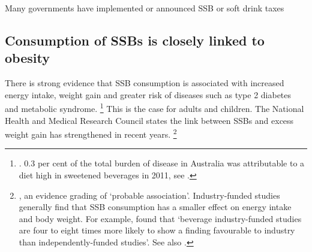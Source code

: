 \documentclass[embargoed]{grattan}
\begin{document}
\begin{table}
\caption{Many governments have implemented or announced SSB or soft drink taxes}




\end{table}

\subsection{Consumption of SSBs is closely linked to obesity}\label{consumption-of-ssbs-is-closely-linked-to-obesity}

There is strong evidence that SSB consumption is associated with increased energy intake, weight gain and greater risk of diseases such as type 2 diabetes and metabolic syndrome.%
\footnote{\textcites{Johnson2009Dietarysugarsintake}{Woodward-Lopez2010whatextenthave}{Ludwig2001Relationconsumptionsugar}{Berkey2004Sugaraddedbeveragesadolescent}{Gill2006weightevidencesuggests}{TeMorenga2013Dietarysugarsbody}{Tam2006Softdrinkconsumption}{Basu2013Relationshipsoftdrink}{Dhingra2007Softdrinkconsumption}{Vartanian2007Effectssoftdrink}{Imamura2015Consumptionsugarsweetened}{Pan2013Changeswaterbeverage}{Malik2006Intakesugarsweetened}{Malik2010Sugarsweetenedbeverages}{Malik2010riskmetaanalysis}{Organization2016Reportcommissionending}{Organisation2015Sugarsintakeadults}{Agriculture2010DietaryGuidelinesAmericans}. 0.3 per cent of the total burden of disease in Australia was attributable to a diet high in sweetened beverages in 2011, see \textcite{Health2016AustralianBurdenDisease}.} This is the case for adults and children.
The National Health and Medical Research Council states the link between SSBs and excess weight gain has strengthened in recent years.%
\footnote{\textcite[][67]{Health2013AustralianDietaryGuidelines}, an evidence grading of `probable association'.
Industry-funded studies generally find that SSB consumption has a smaller effect on energy intake and body weight.
For example, \textcite{Vartanian2007Effectssoftdrink} found that `beverage industry-funded studies are four to eight times more likely to show a finding favourable to industry than independently-funded studies'.
See also \textcites{Bes-Rastrollo2013Financialconflictsinterest}{Lesser2007Relationshipfundingsource}.}
\end{document}
